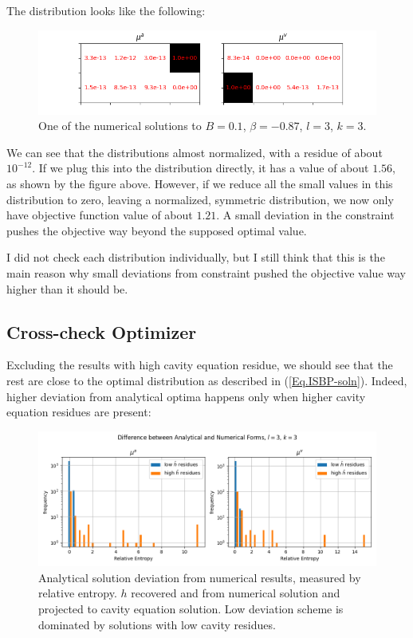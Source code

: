 \documentclass[12pt]{article}
\numberwithin{equation}{section}
\begin{document}
The distribution looks like the following:
\begin{figure}[h]
    \centering
    \includegraphics[width=15cm]{img/Ising_bptt/DIST_sample_large_cavity_res.png}
    \caption{One of the numerical solutions to $B=0.1$, $\beta=-0.87$, $l=3$, $k=3$.}
    \label{Fig.ISBP-DIST-SMPL}
\end{figure}

We can see that the distributions almost normalized, with a residue of about $10^{-12}$. If we plug this into the
distribution directly, it has a value of about $1.56$, as shown by the figure above. However, if we reduce all the
small values in this distribution to zero, leaving a normalized, symmetric distribution, we now only have
objective function value of about $1.21$. A small deviation in the constraint pushes the objective way beyond
the supposed optimal value.

I did not check each distribution individually, but I still think that this is the main reason why small deviations
from constraint pushed the objective value way higher than it should be.

\newpage

\subsection{Cross-check Optimizer}

Excluding the results with high cavity equation residue, we should see that the rest are close to the optimal distribution
as described in (\ref{Eq.ISBP-soln}). Indeed, higher deviation from analytical optima happens only when higher cavity equation
residues are present:
\begin{figure}[h]
    \centering
    \includegraphics[width=15cm]{img/Ising_bptt/SOLN_l=3_k=3.png}
    \caption{Analytical solution deviation from numerical results, measured by relative entropy. $h$ recovered and from
        numerical solution and projected to cavity equation solution. Low deviation scheme is dominated by solutions
        with low cavity residues.}
    \label{Fig.ISBP-SOLN-compare-l3k3}
\end{figure}
\end{document}
